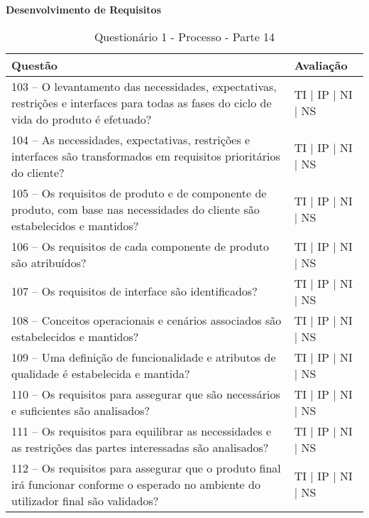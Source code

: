 \documentclass[openany,10pt,a4paper]{article}
\begin{document}
\begin{appendix}
\begin{table}[h]
\textbf{Desenvolvimento de Requisitos}
	\centering
	\caption{Questionário 1 - Processo - Parte 14}
	\begin{tabular}{p{3.5in}p{2in}}		
		\toprule
		\textbf{Questão}  & \textbf{Avaliação}\\ 
		\midrule
		103 – O levantamento das necessidades, expectativas, restrições e interfaces para todas as fases 
do ciclo de vida do produto é efetuado?
 & TI | IP | NI | NS \\
        \midrule
		104 – As necessidades, expectativas, restrições e interfaces são transformados em requisitos 
prioritários do cliente?
 & TI | IP | NI | NS \\
		\midrule
		105 – Os requisitos de produto e de componente de produto, com base nas necessidades do 
cliente são estabelecidos e mantidos?
 & TI | IP | NI | NS \\
		\midrule
        106 – Os requisitos de cada componente de produto são atribuídos?
 & TI | IP | NI | NS \\
		\midrule
		107 – Os requisitos de interface são identificados?
  & TI | IP | NI | NS \\
		\midrule
		108 – Conceitos operacionais e cenários associados são estabelecidos e mantidos?
 & TI | IP | NI | NS \\
 \midrule
		109 – Uma definição de funcionalidade e atributos de qualidade é estabelecida e mantida?
 & TI | IP | NI | NS \\
 \midrule
	110 – Os requisitos para assegurar que são necessários e suficientes são analisados?
 & TI | IP | NI | NS \\
 \midrule
		111 – Os requisitos para equilibrar as necessidades e as restrições das partes interessadas são 
analisados?
 & TI | IP | NI | NS \\
        \midrule
		112 – Os requisitos para assegurar que o produto final irá funcionar conforme o esperado no 
ambiente do utilizador final são validados?
 & TI | IP | NI | NS \\
		\bottomrule
	\end{tabular} 
	\label{tab:tabela1}
\end{table}


\end{appendix}
\end{document}
